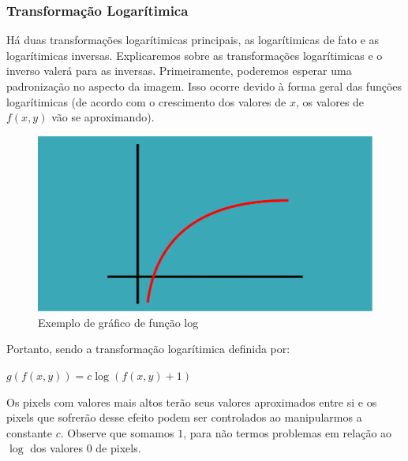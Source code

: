 \documentclass[a4paper, 12pt]{article}
\begin{document}
\subsubsection{Transformação Logarítimica}
Há duas transformações logarítimicas principais, as logarítimicas de fato e as logarítimicas inversas. Explicaremos sobre as transformações 
logarítimicas e o inverso valerá para as inversas. Primeiramente, poderemos esperar uma padronização no aspecto da imagem. Isso ocorre devido à forma 
geral das funções logarítimicas (de acordo com o crescimento dos valores de $x$, os valores de $f(x,y)$ vão se aproximando).
\begin{figure}[!htbp]
	\centering
	\includegraphics[scale=0.15]{images/log.png}
	\caption{Exemplo de gráfico de função log}
\end{figure}

\vspace{6cm}
Portanto, sendo a transformação logarítimica definida por:
\begin{center}
	$g(f(x,y)) = c\log{\left(f(x,y) + 1\right)}$
\end{center}

Os pixels com valores mais altos terão seus valores aproximados entre si e os pixels que sofrerão desse efeito podem ser controlados ao manipularmos a 
constante $c$. Observe que somamos $1$, para não termos problemas em relação ao $\log$ dos valores $0$ de pixels.
\end{document}
